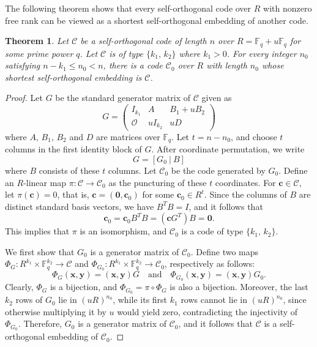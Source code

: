 \documentclass{article}
\newtheorem{theorem}{Theorem}[section]
\theoremstyle{definition}
\theoremstyle{remark}
\begin{document}
The following theorem shows that every self-orthogonal code over $R$ with nonzero free rank can be viewed as a shortest self-orthogonal embedding of another code.
\begin{theorem}\label{SOcofromsmall}
    Let $\mathcal{C}$ be a self-orthogonal code of length $n$ over $R=\mathbb{F}_q+u\mathbb{F}_q$ for some prime power $q$. Let $\mathcal{C}$ is of type $\{k_1,\,k_2\}$ where $k_1>0$. For every integer $n_0$ satisfying $n-k_1\le n_0<n$, there is a code $\mathcal{C}_0$ over $R$ with length $n_0$ whose shortest self-orthogonal embedding is $\mathcal{C}$.
\end{theorem}
\begin{proof}
    Let $G$ be the standard generator matrix of $\mathcal{C}$ given as
    \[
    G=\begin{pmatrix}
        I_{k_1} & A & B_1+uB_2\\
        \mathcal{O} & uI_{k_2} & uD
    \end{pmatrix}
    \]
    where $A,\,B_1,\,B_2$ and $D$ are matrices over $\mathbb{F}_q$. Let $t=n-n_0$, and choose $t$ columns in the first identity block of $G$. After coordinate permutation, we write
    \[
    G=[G_0~|~B]
    \]
    where $B$ consists of these $t$ columns. Let $\mathcal{C}_0$ be the code generated by $G_0$. Define an $R$-linear map $\pi:\mathcal{C}\to \mathcal{C}_0$ as the puncturing of these $t$ coordinates. For $\mathbf{c}\in\mathcal{C}$, let $\pi(\mathbf{c})=0$, that is, $\mathbf{c}=(\mathbf{0}, \mathbf{c}_0)$ for some $\mathbf{c}_0\in R^t$. Since the columns of $B$ are distinct standard basis vectors, we have $B^TB=I$, and it follows that
    \[
    \mathbf{c}_0=\mathbf{c}_0B^TB=(\mathbf{c}G^T)B=\mathbf{0}.
    \]
    This implies that $\pi$ is an isomorphism, and $\mathcal{C}_0$ is a code of type $\{k_1,\,k_2\}$.

    We first show that $G_0$ is a generator matrix of $\mathcal{C}_0$. Define two maps $\Phi_G:R^{k_1}\times \mathbb{F}_q^{k_2}\to \mathcal{C}$ and $\Phi_{G_0}:R^{k_1}\times \mathbb{F}_q^{k_2}\to \mathcal{C}_0$, respectively as follows:
    \[
    \Phi_G(\mathbf{x}, \mathbf{y})=(\mathbf{x}, \mathbf{y})G\quad\mbox{and}\quad
    \Phi_{G_0}(\mathbf{x}, \mathbf{y})=(\mathbf{x}, \mathbf{y})G_0.
    \]
    Clearly, $\Phi_G$ is a bijection, and $\Phi_{G_0}=\pi \circ\Phi_G$ is also a bijection. Moreover, the last $k_2$ rows of $G_0$ lie in $(uR)^{n_0}$, while its first $k_1$ rows cannot lie in $(uR)^{n_0}$, since otherwise multiplying it by $u$ would yield zero, contradicting the injectivity of $\Phi_{G_0}$. Therefore, $G_0$ is a generator matrix of $\mathcal C_0$, and it follows that $\mathcal{C}$ is a self-orthogonal embedding of $\mathcal{C}_0$.


\end{proof}
\end{document}
